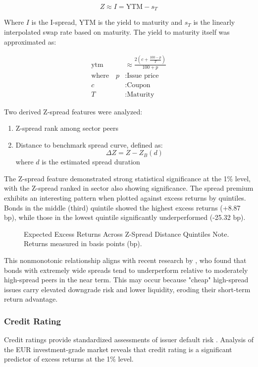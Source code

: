 $$Z \approx I = \text{YTM} - s_T$$

Where $I$ is the I-spread, YTM is the yield to maturity and $s_T$ is the linearly interpolated swap rate based on maturity. The yield to maturity itself was approximated as:

\begin{align}
\text{ytm} &\approx \frac{2(c+ \frac{100-p}{T})}{100+p} \\
\text{where} \quad p &: \text{Issue price} \nonumber\\
c &: \text{Coupon} \nonumber\\
T &: \text{Maturity} \nonumber
\end{align}

Two derived Z-spread features were analyzed:

\begin{enumerate}
    \item Z-spread rank among sector peers
    \item Distance to benchmark spread curve, defined as:
    $$\Delta Z = Z - Z_B(d)$$
    where $d$ is the estimated spread duration
\end{enumerate}

The Z-spread feature demonstrated strong statistical significance at the 1\% level, with the Z-spread ranked in sector also showing significance. The spread premium exhibits an interesting pattern when plotted against excess returns by quintiles. Bonds in the middle (third) quintile showed the highest excess returns (+8.87 bp), while those in the lowest quintile significantly underperformed (-25.32 bp).

\begin{figure}[h]
    \begin{center}
        
    \end{center}
    \caption{Expected Excess Returns Across Z-Spread Distance Quintiles Note. Returns measured in basis points (bp).}
    \label{fig:z_premium}
\end{figure}

This nonmonotonic relationship aligns with recent research by \textcite{Dickerson2024FactorDelays}, who found that bonds with extremely wide spreads tend to underperform relative to moderately high-spread peers in the near term. This may occur because "cheap" high-spread issues carry elevated downgrade risk and lower liquidity, eroding their short-term return advantage.

\subsubsection{Credit Rating}
Credit ratings provide standardized assessments of issuer default risk \parencite[pp. 26 - 28]{Fabozzi2021TheEdition}. Analysis of the EUR investment-grade market reveals that credit rating is a significant predictor of excess returns at the 1\% level.

